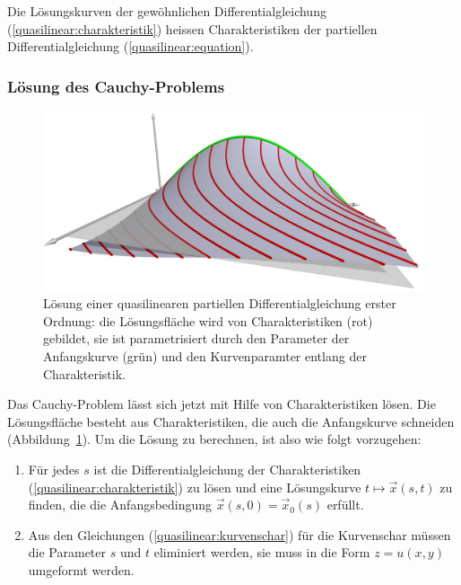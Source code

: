 \begin{definition}
\label{def:quasiliniear:charakteristik}
Die Lösungskurven der gewöhnlichen Differentialgleichung
(\ref{quasilinear:charakteristik}) heissen Charakteristiken
der partiellen Differentialgleichung (\ref{quasilinear:equation}).
\end{definition}

\subsubsection{Lösung des Cauchy-Problems}
\begin{figure}
\begin{center}
\includegraphics[width=\hsize]{../common/3d/sol.jpg}
\end{center}
\caption{Lösung einer quasilinearen partiellen Differentialgleichung
erster Ordnung: die Lösungsfläche wird von Charakteristiken (rot) gebildet,
sie ist parametrisiert durch den Parameter der Anfangskurve (grün) und den
Kurvenparamter entlang der Charakteristik.
\label{geometrie:loesung-mit-charakteristiken}}
\end{figure}
Das Cauchy-Problem lässt sich jetzt mit Hilfe von Charakteristiken
lösen. Die Lösungsfläche besteht aus Charakteristiken, die auch
die Anfangskurve schneiden
(Abbildung~\ref{geometrie:loesung-mit-charakteristiken}).
Um die Lösung zu berechnen, ist also wie folgt vorzugehen:
\begin{enumerate}
\item
Für jedes $s$ ist die Differentialgleichung der Charakteristiken
(\ref{quasilinear:charakteristik}) zu lösen und eine 
Lösungskurve $t\mapsto \vec x(s,t)$ zu finden, die
die Anfangsbedingung $\vec x(s,0)=\vec x_0(s)$ erfüllt.
\item 
Aus den Gleichungen (\ref{quasilinear:kurvenschar}) für die
Kurvenschar müssen die Parameter $s$ und $t$ eliminiert werden,
sie muss in die Form $z=u(x,y)$ umgeformt werden.
\end{enumerate}

